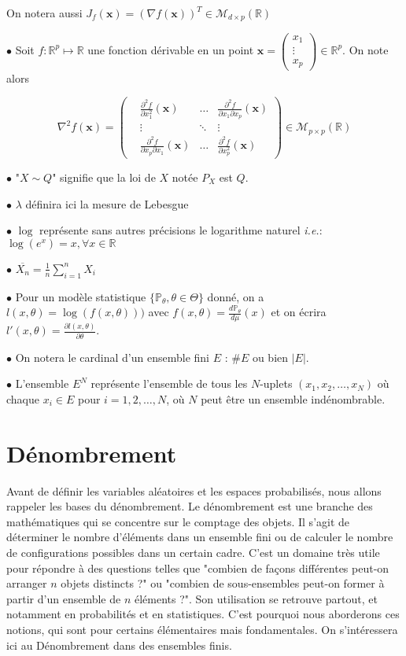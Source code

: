 \documentclass[12pt]{article}
\newcommand{\petitespace}{\vspace{0.5cm}}
\newcommand{\bb}[1]{\mathbb{#1}} %
\newcommand{\R}{\bb{R}} %
\renewcommand{\bf}[1]{\mathbf{#1}}
\renewcommand{\P}{\bb{P}}%
\renewcommand{\d}{\partial} %
\newcommand{\ie}{\textit{i.e.}}
\newcommand{\somme}[2]{\sum\limits_{#1}^{#2}}
\renewcommand{\cal}{\mathcal}
\renewcommand{\bf}[1]{\mathbf{#1}}
\newcommand{\modelstat}{\{ \P_\theta, \theta \in \Theta\}}
\newcommand{\1}{\bb{1}} %
\newcommand{\Xbarre}{\overline{X_n}}
\begin{document}
On notera aussi $J_f(\bf x) = (\nabla f(\bf x))^T \in \cal M_{d \times p}(\R)$

$\bullet$ Soit $f : \R^p \mapsto \R$ une fonction dérivable en un point $\bf x =\begin{pmatrix} x_1 \\ \vdots \\ x_p  \end{pmatrix}   \in \R^p$. On note alors \petitespace

$$\nabla^2 f(\bf x) = \begin{pmatrix} &\frac{\d^2 f}{\d x_1^2}(\bf x) & \ldots & \frac{\d^2 f}{\d x_1\d x_p}(\bf x) \\ &\vdots &\ddots &\vdots \\ & \frac{\d^2 f}{\d x_p\d x_1}(\bf x) & \ldots & \frac{\d^2 f}{\d x_p^2}(\bf x) \end{pmatrix} \in \cal M_{p \times p}(\R)$$\petitespace


$\bullet$ "$X \sim Q$" signifie que la loi de $X$ notée $P_X$ est $Q$.

$\bullet$ $\lambda$ définira ici la mesure de Lebesgue

$\bullet$ $\log$ représente sans autres précisions le logarithme naturel \ie : $ \log(e^x) = x, \forall x \in \R$

$\bullet$  $\Xbarre = \frac 1n \somme{i=1}{n} X_i$


$\bullet$  Pour un modèle statistique $\modelstat$ donné, on a $l(x,\theta) = \log(f(x, \theta)))$ avec $f(x,\theta) = \frac{d\P_\theta}{d \mu}(x)$ et on écrira $l'(x, \theta) = \frac{\d l(x,\theta)}{\d \theta}$.

$\bullet$  On notera le cardinal d'un ensemble fini $E$ : $\#E$ ou bien $|E|$.

$\bullet$ L'ensemble \(E^N\) représente l'ensemble de tous les \(N\)-uplets \((x_1, x_2, \ldots, x_N)\) où chaque \(x_i \in E\) pour \(i = 1, 2, \ldots, N\), où $N$ peut être un ensemble indénombrable.


\newpage


\section{Dénombrement}

Avant de définir les variables aléatoires et les espaces probabilisés, nous allons rappeler les bases du dénombrement. Le dénombrement est une branche des mathématiques qui se concentre sur le comptage des objets. Il s'agit de déterminer le nombre d'éléments dans un ensemble fini ou de calculer le nombre de configurations possibles dans un certain cadre. C'est un domaine très utile pour répondre à des questions telles que  "combien de façons différentes peut-on arranger $n$ objets distincts ?" ou "combien de sous-ensembles peut-on former à partir d'un ensemble de $n$ éléments ?". Son utilisation se retrouve partout, et notamment en probabilités et en statistiques. C'est pourquoi nous aborderons ces notions, qui sont pour certains élémentaires mais fondamentales. On s'intéressera ici au Dénombrement dans des ensembles finis. 
\end{document}
